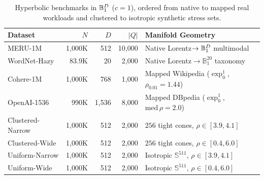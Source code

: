 \begin{table}[t]
  \centering
  \caption{Hyperbolic benchmarks in $\mathbb{B}_1^D$ ($c=1$), ordered from native to mapped real workloads and clustered to isotropic synthetic stress sets.}
  \label{tab:datasets}
  \footnotesize
  \setlength{\tabcolsep}{3pt}
  \begin{tabularx}{\linewidth}{@{}lrrr>{\raggedright\arraybackslash}X@{}}
    \toprule
    \textbf{Dataset} & $N$ & $D$ & $|Q|$ & \textbf{Manifold Geometry} \\
    \midrule
    MERU-1M~\cite{astrmira2026meruimagenet1m} & 1,000K & 512 & 10,000 & Native {Lorentz}$\to\mathbb{B}_1^D$ multimodal \\
    WordNet-Hazy & 83.9K & 20 & 2,000 & Native {Lorentz}$\to\mathbb{B}_1^{20}$ taxonomy \\
    Cohere-1M & 1,000K & 768 & 1,000 & Mapped Wikipedia ($\exp_0^1$, $\rho_{0.01}=1.44$) \\
    OpenAI-1536 & 990K & 1,536 & 8,000 & Mapped DBpedia ($\exp_0^1$, $\text{med}\,\rho=2.0$) \\
    \midrule
    Clustered-Narrow & 1,000K & 512 & 2,000 & $256$ tight cones, $\rho \in [3.9, 4.1]$ \\
    Clustered-Wide & 1,000K & 512 & 2,000 & $256$ tight cones, $\rho \in [0.4, 6.0]$ \\
    Uniform-Narrow & 1,000K & 512 & 2,000 & Isotropic $\mathbb{S}^{511}$, $\rho \in [3.9, 4.1]$ \\
    Uniform-Wide & 1,000K & 512 & 2,000 & Isotropic $\mathbb{S}^{511}$, $\rho \in [0.4, 6.0]$ \\
    \bottomrule
  \end{tabularx}
\end{table}

